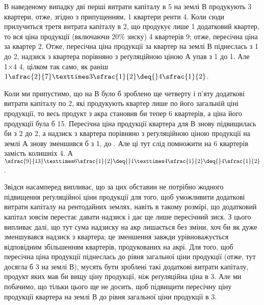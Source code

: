 В наведеному випадку дві перші витрати капіталу в 5 на землі $В$
продукують 3 квартери, отже, згідно з припущенням, 1
квартери ренти \deq{} 4. Коли сюди прилучиться третя витрата
капіталу в 2,
що продукує лише 1 додатковий квартер, то вся ціна продукції (включаючи 20\%
зиску) 4 квартерів \deq{} 9; отже, пересічна ціна за
квартер \deq{} 2. Отже, пересічна ціна продукції за квартер на землі $В$
піднеслась з 1
до 2, надзиск з квартера порівняно з реґуляційною ціною $А$ упав
з 1 до 1. Але 1×4 \deq{} 4, цілком так само,
як раніш $1\sfrac{2}{7} × 3\sfrac{1}{2} \deq{} 4\sfrac{1}{2}$.

Коли ми припустимо, що на $В$ було б зроблено ще четверту і п’яту додаткові
витрати капіталу по 2, які продукують квартер лише по його
загальній ціні продукції, то весь продукт з акра становив би тепер 6 квартерів,
а ціна його продукції була б 15. Пересічна ціна продукції
квартера для $В$ знову підвищилась би з 2
до 2, а надзиск з квартера
порівняно з реґуляційною ціною продукції на землі $А$ знову зменшився
б з 1, до . Але ці  тут слід
помножити на 6 квартерів замість колишніх 4.
$А$ $\sfrac{9}{13}×6\sfrac{1}{2} \deq{} 1× 4\sfrac{1}{2} \deq{} 4\sfrac{1}{2}$.

Звідси насамперед випливає, що за цих обставин не потрібно жодного підвищення
реґуляційної ціни продукції для того, щоб уможливити додаткові витрати
капіталу на рентодайних землях, навіть в такому розмірі, що додатковий
капітал зовсім перестає давати надзиск і дає ще лише пересічний зиск. З
цього випливає далі, що тут сума надзиску на акр лишається без зміни,
хоч би як дуже зменшувався надзиск з квартера; це зменшення завжди урівноважується
відповідним збільшенням квартерів, продукованих на акрі. Для того,
щоб пересічна ціна продукції піднеслась до рівня загальної ціни продукції (отже,
тут досягла б 3 на землі $В$), мусять бути зроблені такі додаткові витрати
капіталу, продукт яких мав би вищу ціну продукції, ніж реґуляційна ціна
в 3. Але ми побачимо, що тільки цього ще не досить, щоб підвищити
пересічну ціну продукції квартера на землі $В$ до рівня загальної ціни продукції
в 3.

